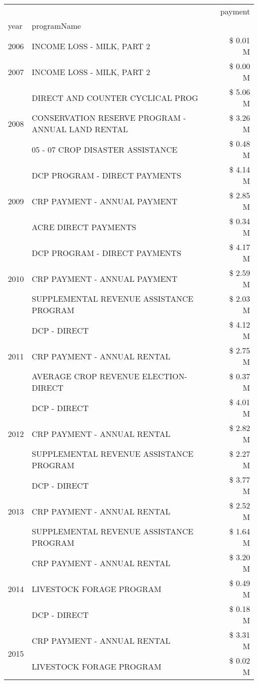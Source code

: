 \begin{tabular}{llr}
\toprule
 &  & payment \\
year & programName &  \\
\midrule
2006 & INCOME LOSS - MILK, PART 2 & \$ 0.01 M \\
\cline{1-3}
2007 & INCOME LOSS - MILK, PART 2 & \$ 0.00 M \\
\cline{1-3}
\multirow[t]{3}{*}{2008} & DIRECT AND COUNTER CYCLICAL PROG & \$ 5.06 M \\
 & CONSERVATION RESERVE PROGRAM - ANNUAL LAND RENTAL & \$ 3.26 M \\
 & 05 - 07 CROP DISASTER ASSISTANCE & \$ 0.48 M \\
\cline{1-3}
\multirow[t]{3}{*}{2009} & DCP PROGRAM - DIRECT PAYMENTS & \$ 4.14 M \\
 & CRP PAYMENT - ANNUAL PAYMENT & \$ 2.85 M \\
 & ACRE DIRECT PAYMENTS & \$ 0.34 M \\
\cline{1-3}
\multirow[t]{3}{*}{2010} & DCP PROGRAM - DIRECT PAYMENTS & \$ 4.17 M \\
 & CRP PAYMENT - ANNUAL PAYMENT & \$ 2.59 M \\
 & SUPPLEMENTAL REVENUE ASSISTANCE PROGRAM & \$ 2.03 M \\
\cline{1-3}
\multirow[t]{3}{*}{2011} & DCP - DIRECT & \$ 4.12 M \\
 & CRP PAYMENT - ANNUAL RENTAL & \$ 2.75 M \\
 & AVERAGE CROP REVENUE ELECTION-DIRECT & \$ 0.37 M \\
\cline{1-3}
\multirow[t]{3}{*}{2012} & DCP - DIRECT & \$ 4.01 M \\
 & CRP PAYMENT - ANNUAL RENTAL & \$ 2.82 M \\
 & SUPPLEMENTAL REVENUE ASSISTANCE PROGRAM & \$ 2.27 M \\
\cline{1-3}
\multirow[t]{3}{*}{2013} & DCP - DIRECT & \$ 3.77 M \\
 & CRP PAYMENT - ANNUAL RENTAL & \$ 2.52 M \\
 & SUPPLEMENTAL REVENUE ASSISTANCE PROGRAM & \$ 1.64 M \\
\cline{1-3}
\multirow[t]{3}{*}{2014} & CRP PAYMENT - ANNUAL RENTAL & \$ 3.20 M \\
 & LIVESTOCK FORAGE PROGRAM & \$ 0.49 M \\
 & DCP - DIRECT & \$ 0.18 M \\
\cline{1-3}
\multirow[t]{2}{*}{2015} & CRP PAYMENT - ANNUAL RENTAL & \$ 3.31 M \\
 & LIVESTOCK FORAGE PROGRAM & \$ 0.02 M \\

\end{tabular}
